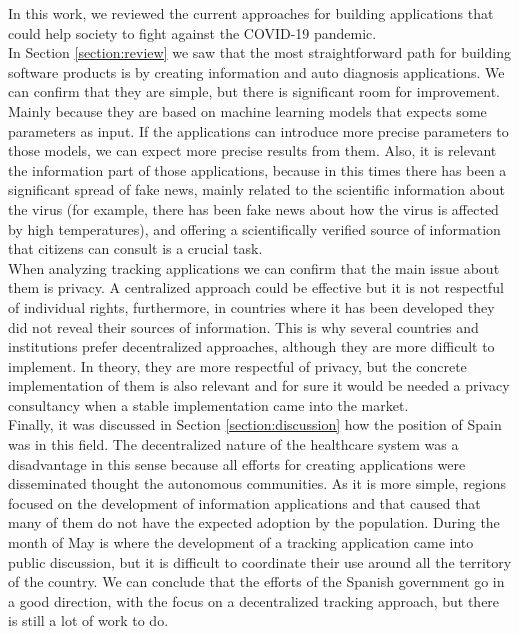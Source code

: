 \documentclass[a4paper, 12pt]{article}
\begin{document}
In this work, we reviewed the current approaches for building applications that could help society to fight against the COVID-19 pandemic.\\

In Section \ref{section:review} we saw that the most straightforward path for building software products is by creating information and auto diagnosis applications. We can confirm that they are simple, but there is significant room for improvement. Mainly because they are based on machine learning models that expects some parameters as input. If the applications can introduce more precise parameters to those models, we can expect more precise results from them. Also, it is relevant the information part of those applications, because in this times there has been a significant spread of fake news, mainly related to the scientific information about the virus (for example, there has been fake news about how the virus is affected by high temperatures), and offering a scientifically verified source of information that citizens can consult is a crucial task.\\

When analyzing tracking applications we can confirm that the main issue about them is privacy. A centralized approach could be effective but it is not respectful of individual rights, furthermore, in countries where it has been developed they did not reveal their sources of information. This is why several countries and institutions prefer decentralized approaches, although they are more difficult to implement. In theory, they are more respectful of privacy, but the concrete implementation of them is also relevant and for sure it would be needed a privacy consultancy when a stable implementation came into the market. \\

Finally, it was discussed in Section \ref{section:discussion} how the position of Spain was in this field. The decentralized nature of the healthcare system was a disadvantage in this sense because all efforts for creating applications were disseminated thought the autonomous communities. As it is more simple, regions focused on the development of information applications and that caused that many of them do not have the expected adoption by the population. During the month of May is where the development of a tracking application came into public discussion, but it is difficult to coordinate their use around all the territory of the country. We can conclude that the efforts of the Spanish government go in a good direction, with the focus on a decentralized tracking approach, but there is still a lot of work to do.


\newpage{\pagestyle{empty}}




\nocite{*}
\end{document}
